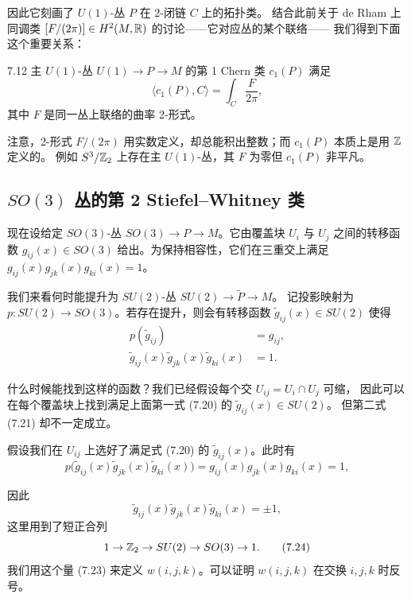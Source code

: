 因此它刻画了 $U(1)$-丛 $P$ 在 2-闭链 $C$ 上的拓扑类。
结合此前关于 de Rham 上同调类 $[F/(2\pi)]\in H^2(M,\mathbb{R})$ 的讨论——它对应丛的某个联络——
我们得到下面这个重要关系：

\begin{proposition}{7.12}
主 $U(1)$-丛 $U(1)\to P\to M$ 的第 1 Chern 类 $c_1(P)$ 满足
\begin{equation}
\langle c_1(P),C\rangle=\int_C\frac{F}{2\pi},
\tag{7.19}
\end{equation}
其中 $F$ 是同一丛上联络的曲率 2-形式。
\end{proposition}

注意，2-形式 $F/(2\pi)$ 用实数定义，却总能积出整数；而 $c_1(P)$ 本质上是用 $\mathbb{Z}$ 定义的。
例如 $S^3/\mathbb{Z}_2$ 上存在主 $U(1)$-丛，其 $F$ 为零但 $c_1(P)$ 非平凡。

\subsection{$SO(3)$ 丛的第 2 Stiefel--Whitney 类}

现在设给定 $SO(3)$-丛 $SO(3)\to P\to M$。它由覆盖块 $U_i$ 与 $U_j$ 之间的转移函数
$g_{ij}(x)\in SO(3)$ 给出。为保持相容性，它们在三重交上满足
$g_{ij}(x)g_{jk}(x)g_{ki}(x)=1$。

我们来看何时能提升为 $SU(2)$-丛 $SU(2)\to\tilde P\to M$。
记投影映射为 $p:SU(2)\to SO(3)$。若存在提升，则会有转移函数
$\tilde g_{ij}(x)\in SU(2)$ 使得
\begin{align}
p(\tilde g_{ij}) &= g_{ij}, \tag{7.20}\\
\tilde g_{ij}(x)\tilde g_{jk}(x)\tilde g_{ki}(x) &= 1. \tag{7.21}
\end{align}

什么时候能找到这样的函数？我们已经假设每个交 $U_{ij}=U_i\cap U_j$ 可缩，
因此可以在每个覆盖块上找到满足上面第一式 (7.20) 的 $\tilde g_{ij}(x)\in SU(2)$。
但第二式 (7.21) 却不一定成立。

假设我们在 $U_{ij}$ 上选好了满足式 (7.20) 的 $\tilde g_{ij}(x)$。此时有
\begin{equation}
p\bigl(\tilde g_{ij}(x)\tilde g_{jk}(x)\tilde g_{ki}(x)\bigr)
=g_{ij}(x)g_{jk}(x)g_{ki}(x)=1,
\tag{7.22}
\end{equation}

因此
\begin{equation}
\tilde g_{ij}(x)\tilde g_{jk}(x)\tilde g_{ki}(x)=\pm1,
\tag{7.23}
\end{equation}
这里用到了短正合列
\begin{equation}
1\to\mathbb{Z}_2\to SU(2)\to SO(3)\to 1.
\tag{7.24}
\end{equation}
我们用这个量 (7.23) 来定义 $w(i,j,k)$。可以证明 $w(i,j,k)$ 在交换 $i,j,k$ 时反号。

